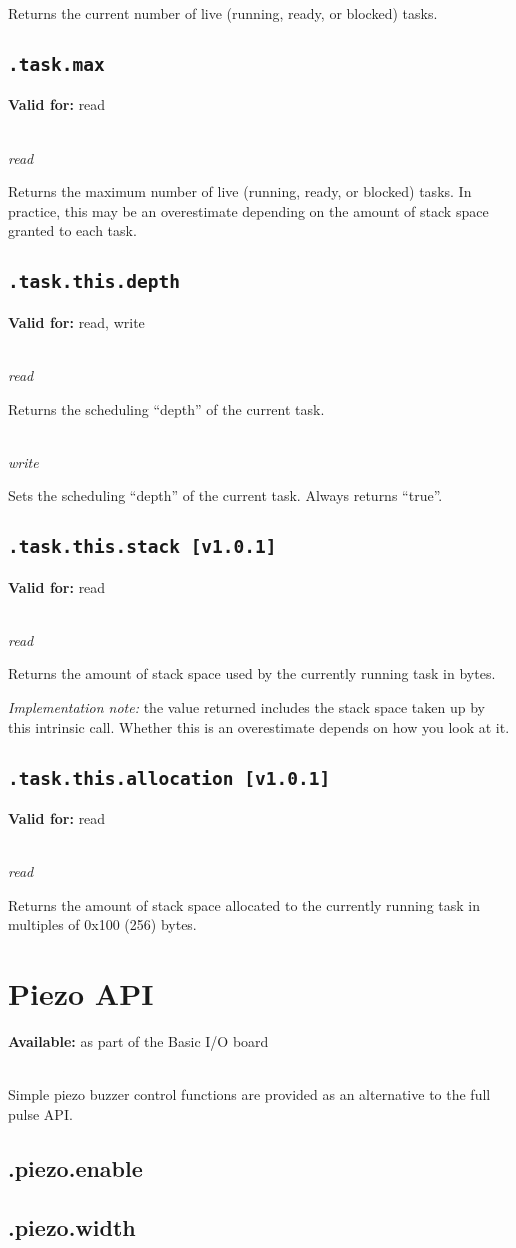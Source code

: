 \documentclass{article}
\begin{document}
Returns the current number of live (running, ready, or blocked) tasks.

\subsection{\texttt{.task.max}}
\textbf{Valid for:} read

~\\
\textit{read}

Returns the maximum number of live (running, ready, or blocked) tasks. In practice, this may be an overestimate depending on the amount of stack space granted to each task.

\subsection{\texttt{.task.this.depth}}
\textbf{Valid for:} read, write

~\\
\textit{read}

Returns the scheduling ``depth'' of the current task.

~\\
\textit{write}

Sets the scheduling ``depth'' of the current task. Always returns ``true''.

\subsection{\texttt{.task.this.stack [v1.0.1]}}
\textbf{Valid for:} read

~\\
\textit{read}

Returns the amount of stack space used by the currently running task in bytes.

\textit{Implementation note:} the value returned includes the stack space taken up by this intrinsic call.
Whether this is an overestimate depends on how you look at it.

\subsection{\texttt{.task.this.allocation [v1.0.1]}}
\textbf{Valid for:} read

~\\
\textit{read}

Returns the amount of stack space allocated to the currently running task in multiples of 0x100 (256) bytes.

\section{Piezo API}
\textbf{Available:} as part of the Basic I/O board

~\\
Simple piezo buzzer control functions are provided as an alternative to the full pulse API.

\subsection{.piezo.enable}
\subsection{.piezo.width}
\end{document}
